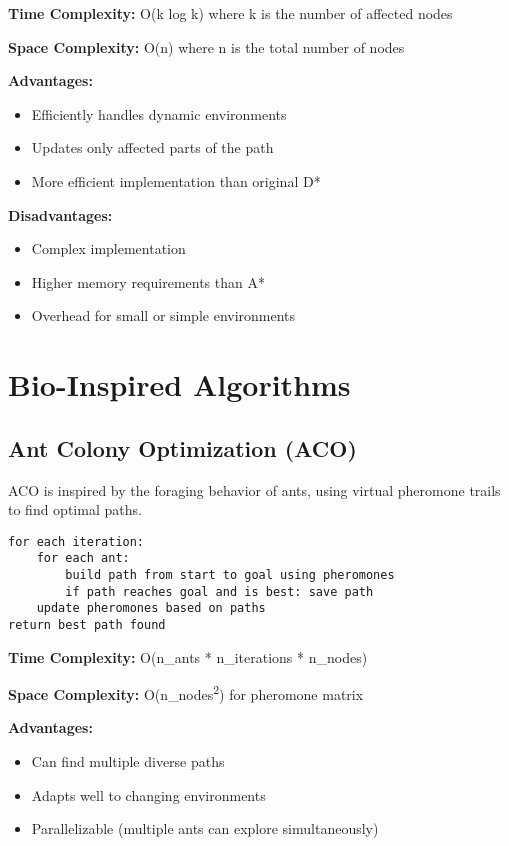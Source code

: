 \documentclass[11pt,a4paper]{report}
\begin{document}
\textbf{Time Complexity:} O(k log k) where k is the number of affected nodes

\textbf{Space Complexity:} O(n) where n is the total number of nodes

\textbf{Advantages:}
\begin{itemize}
    \item Efficiently handles dynamic environments
    \item Updates only affected parts of the path
    \item More efficient implementation than original D*
\end{itemize}

\textbf{Disadvantages:}
\begin{itemize}
    \item Complex implementation
    \item Higher memory requirements than A*
    \item Overhead for small or simple environments
\end{itemize}

\section{Bio-Inspired Algorithms}

\subsection{Ant Colony Optimization (ACO)}
ACO is inspired by the foraging behavior of ants, using virtual pheromone trails to find optimal paths.

\begin{verbatim}
for each iteration:
    for each ant:
        build path from start to goal using pheromones
        if path reaches goal and is best: save path
    update pheromones based on paths
return best path found
\end{verbatim}

\textbf{Time Complexity:} O(n\_ants * n\_iterations * n\_nodes)

\textbf{Space Complexity:} O(n\_nodes\textsuperscript{2}) for pheromone matrix

\textbf{Advantages:}
\begin{itemize}
    \item Can find multiple diverse paths
    \item Adapts well to changing environments
    \item Parallelizable (multiple ants can explore simultaneously)
\end{itemize}
\end{document}
